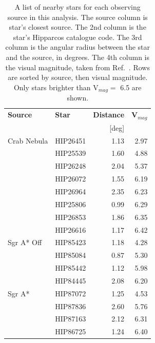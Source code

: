     \begin{table}[t]
      \centering
      \begin{tabular}{|l|l|r|r|}
        \hline
        \textbf{Source} & \textbf{Star} & \textbf{Distance} & \textbf{V${}_{mag}$} \\ 
                        &               & [deg]             &                      \\
        \hline
        Crab Nebula & HIP26451 & 1.13 & 2.97 \\
                    & HIP25539 & 1.60 & 4.88 \\
                    & HIP26248 & 2.04 & 5.37 \\
                    & HIP26072 & 1.55 & 6.19 \\
                    & HIP26964 & 2.35 & 6.23 \\
                    & HIP25806 & 0.99 & 6.29 \\
                    & HIP26853 & 1.86 & 6.35 \\
                    & HIP26616 & 1.17 & 6.42 \\
        \hline
        Sgr A* Off  & HIP85423 & 1.18 & 4.28 \\
                    & HIP85084 & 0.87 & 5.30 \\
                    & HIP85442 & 1.12 & 5.98 \\
                    & HIP84445 & 2.08 & 6.20 \\
        \hline
        Sgr A*      & HIP87072 & 1.25 & 4.53 \\
                    & HIP87836 & 2.60 & 5.76 \\
                    & HIP87163 & 2.12 & 6.31 \\
                    & HIP86725 & 1.24 & 6.40 \\
        \hline
      \end{tabular}
      \caption[Bright Stars in the Fields of View]{
        A list of nearby stars for each observing source in this analysis.
        The source column is star's closest source.
        The 2nd column is the star's Hipparcos catalogue code.
        The 3rd column is the angular radius between the star and the source, in degrees.
        The 4th column is the visual magnitude, taken from Ref.~\cite{hipparcos_catalogue}.
        Rows are sorted by source, then visual magnitude.
        Only stars brighter than V${}_{mag}=$ 6.5 are shown.
      }
      \label{tab:brightstars}
    \end{table}

